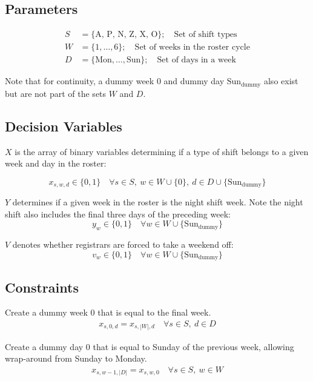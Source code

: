 \documentclass[a4paper]{article}
\begin{document}
\subsection{Parameters}
\begin{multicols}{2}
\noindent
\begin{align*}
S &= \{\text{A, P, N, Z, X, O}\}; \quad\text{Set of shift types}\\
W &= \{1, \dots, 6\}; \quad\text{Set of weeks in the roster cycle}\\
D &= \{\text{Mon},\dots,\text{Sun}\}; \quad\text{Set of days in a week}
\end{align*}

Note that for continuity, a dummy week $0$ and dummy day $\text{Sun}_\text{dummy}$ also exist but are not part of the sets $W$ and $D$.
\end{multicols}
\subsection{Decision Variables}

$X$ is the array of binary variables determining if a type of shift belongs to a given week and day in the roster:

$$x_{s, w, d} \in \{0, 1\} \quad\forall s\in S,\  w\in W \cup \{0\},\ d\in D \cup \{\text{Sun}_\text{dummy}\}$$

$Y$ determines if a given week in the roster is the night shift week. Note the night shift also includes the final three days of the preceding week:
$$y_w \in \{0, 1\} \quad\forall w\in W \cup \{\text{Sun}_\text{dummy}\}$$

$V$ denotes whether registrars are forced to take a weekend off:
$$v_w \in \{0, 1\} \quad\forall w\in W \cup \{\text{Sun}_\text{dummy}\}$$

\subsection{Constraints}

Create a dummy week 0 that is equal to the final week.
\begin{align}
  x_{s, 0, d} = x_{s, |W|, d} \quad\forall s\in S,\ d\in D
\end{align}

Create a dummy day 0 that is equal to Sunday of the previous week, allowing wrap-around from Sunday to Monday.
\begin{align}
  x_{s, w-1, |D|} = x_{s, w, 0} \quad\forall s\in S,\ w\in W
\end{align}
\end{document}
